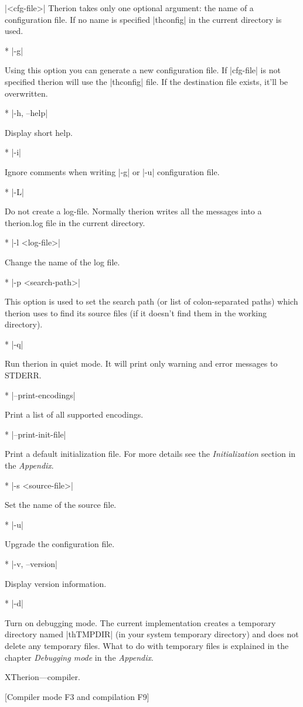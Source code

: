 \arguments
  |<cfg-file>| 
  Therion takes only one optional argument: the name of a configuration
  file. If no name is specified |thconfig| in the current directory is used. 
\endarguments

\options
* |-g|

        Using this option you can generate a new configuration file.
        If |cfg-file| is not specified therion will use the |thconfig|
        file. If the destination file exists, it'll be overwritten.
        
* |-h, --help|

        Display short help.

* |-i|

        Ignore comments when writing |-g| or |-u| configuration file.

* |-L|

        Do not create a log-file. Normally therion writes all the messages
        into a therion.log file in the current directory.
        
* |-l <log-file>|

        Change the name of the log file.
        
* |-p <search-path>|

        This option is used to set the search path (or list of 
	colon-separated paths) which therion uses to find its source
        files (if it doesn't find them in the working directory).

* |-q|

        Run therion in quiet mode. It will print only warning
        and error messages to STDERR.

* |--print-encodings|

        Print a list of all supported encodings.
        
* |--print-init-file|

        Print a default initialization file. For more details
        see the {\it Initialization} section in the {\it Appendix}.
        
* |-s <source-file>|

        Set the name of the source file.
        
* |-u|

        Upgrade the configuration file.

* |-v, --version|

        Display version information.        
        
* |-d|

        Turn on debugging mode. The current implementation creates a 
	temporary directory named |thTMPDIR| (in your system temporary 
	directory) and does not delete any temporary files. 
	What to do with temporary files is explained in the chapter
	{\it Debugging mode} in the {\it Appendix}.
\endoptions

\subsubchapter XTherion---compiler.

[Compiler mode F3 and compilation F9]


\endinput
